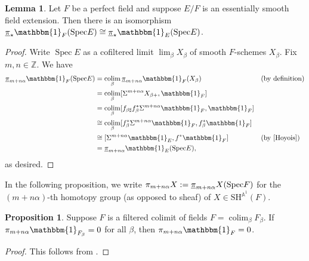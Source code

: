\documentclass[10pt]{amsart}
\numberwithin{equation}{section}
\theoremstyle{plain}
\theoremstyle{definition}
\newtheorem{prop}[prop]{Proposition}
\newtheorem{lemma}[lemma]{Lemma}
\theoremstyle{remark}
\begin{document}
\begin{lemma}\label{lemma:ess}
Let $F$ be a perfect field and suppose $E/F$ is an essentially smooth field extension.  
Then there is an isomorphism ${\underline{\smash{\pi}}}_\star{\mathbbm{1}}_F({\operatorname{Spec}} E)\cong {\underline{\smash{\pi}}}_\star{\mathbbm{1}}_E({\operatorname{Spec}} E)$.
\end{lemma}
\begin{proof}
Write ${\operatorname{Spec}} E$ as a cofiltered limit $\lim_\beta X_\beta$ of smooth $F$-schemes $X_\beta$.  Fix $m,n\in {\mathbb{Z}}$.  We have
\[\begin{aligned}
  {\underline{\smash{\pi}}}_{m+n\alpha}{\mathbbm{1}}_F({\operatorname{Spec}} E)
  &=\operatorname*{\mathrm{colim}}_\beta{\underline{\smash{\pi}}}_{m+n\alpha}{\mathbbm{1}}_F(X_\beta) && \text{(by definition)}\\
  &= \operatorname*{\mathrm{colim}}_\beta [\Sigma^{m+n\alpha}X_{\beta+},{\mathbbm{1}}_F]\\
  &= \operatorname*{\mathrm{colim}}_\beta [f_{\beta\sharp} f_\beta^*\Sigma^{m+n\alpha}{\mathbbm{1}}_F,{\mathbbm{1}}_F]\\
  &\cong \operatorname*{\mathrm{colim}}_\beta [f_\beta^*\Sigma^{m+n\alpha}{\mathbbm{1}}_F,f_\beta^*{\mathbbm{1}}_F]\\
  &\cong [\Sigma^{m+n\alpha}{\mathbbm{1}}_E,f^*{\mathbbm{1}}_F] && \text{(by \cite[Lemma A.7(1)]{Hoyois})}\\
  &= {\underline{\smash{\pi}}}_{m+n\alpha}{\mathbbm{1}}_E({\operatorname{Spec}} E),
\end{aligned}
\]
as desired.
\end{proof}

In the following proposition, we write $\pi_{m+n\alpha}X := {\underline{\smash{\pi}}}_{m+n\alpha}X({\operatorname{Spec}} F)$ for the $(m+n\alpha)$-th homotopy group (as opposed to sheaf) of $X\in {\mathrm{SH}^{{\mathbb{A}}^1}\!}(F)$.

\begin{prop}\label{prop:colim}
Suppose $F$ is a filtered colimit of fields $F = \operatorname*{\mathrm{colim}}_\beta F_\beta$.  If $\pi_{m+n\alpha}{\mathbbm{1}}_{F_\beta} = 0$ for all $\beta$, then $\pi_{m+n\alpha}{\mathbbm{1}}_F = 0$.
\end{prop}
\begin{proof}
This follows from \cite[Lemma A.7(1)]{Hoyois}.
\end{proof}
\end{document}
